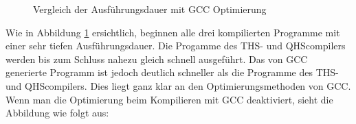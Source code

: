 \begin{figure}[H]
    \centering
    \label{fig:executespeed_optimized}
    \caption{Vergleich der Ausführungsdauer mit GCC Optimierung}
\end{figure}

Wie in Abbildung \ref{fig:executespeed_optimized} ersichtlich, beginnen alle drei kompilierten Programme mit einer sehr tiefen Ausführungsdauer.
Die Progamme des THS- und QHScompilers werden bis zum Schluss nahezu gleich schnell ausgeführt.
Das von GCC generierte Programm ist jedoch deutlich schneller als die Programme des THS- und QHScompilers.
Dies liegt ganz klar an den Optimierungsmethoden von GCC. Wenn man die Optimierung beim Kompilieren mit GCC deaktiviert, sieht die Abbildung wie folgt aus:

